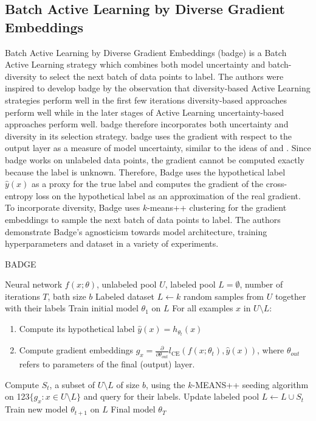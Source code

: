\subsection{Batch Active Learning by Diverse Gradient Embeddings}
\label{sec:Related_work:Active_Learning:BADGE}
Batch Active Learning by Diverse Gradient Embeddings (\gls{badge}) \cite{ash2019deep} is a Batch Active Learning strategy which combines both model uncertainty
and batch-diversity to select the next batch of data points to label. The authors were inspired to develop \gls{badge} by the observation that diversity-based
Active Learning strategies perform well in the first few iterations diversity-based approaches perform well while in the later stages of Active Learning
uncertainty-based approaches perform well. \gls{badge} therefore incorporates both uncertainty and diversity in its selection strategy. \gls{badge} uses the
gradient with respect to the output layer as a measure of model uncertainty, similar to the ideas of \cite{zhang2017active} and \cite{settles2007multiple}.
Since \gls{badge} works on unlabeled data points, the gradient cannot be computed exactly because the label is unknown. Therefore, Badge uses the hypothetical
label $\hat{y}(x)$ as a proxy for the true label and computes the gradient of the cross-entropy loss on the hypothetical label as an approximation of the
real gradient. To incorporate diversity, Badge uses $k$-means++ clustering \cite{arthur2007k} for the gradient embeddings to sample the next batch of data
points to label. The authors demonstrate Badge's agnosticism towards model architecture, training hyperparameters and dataset in a variety of experiments. 
\begin{algorithm}
    \caption{BADGE} \label{alg:Badge}
    \begin{algorithmic}[1]
        \Require Neural network $f(x;\theta)$, unlabeled pool $U$, labeled pool $L=\emptyset$, number of iterations $T$, bath size $b$
        \State Labeled dataset $L \leftarrow k$ random samples from $U$ together with their labels
        \State Train initial model $\theta_1$ on $L$
            \State For all examples $x$ in $U \setminus L$:
            \begin{enumerate}[leftmargin=0.8in]
                \item Compute its hypothetical label $\hat{y}(x) = h_{\theta_t}(x)$
                \item Compute gradient embeddings $g_x = \frac{\partial}{\partial \theta_{out}} l_{\text{CE}}(f(x;\theta_t),\hat{y}(x))$, where
                $\theta_{out}$ refers to parameters of the final (output) layer.
            \end{enumerate}
            \State Compute $S_t$, a subset of $U \setminus L$ of size $b$, using the $k$-MEANS++ seeding algorithm on {\color{white} 123}$\{ g_x: x \in U
            \setminus L\}$ and query for their labels.
            \State Update labeled pool $L \leftarrow L \cup S_t$
            \State Train new model $\theta_{t+1}$ on $L$
        \EndFor
        \return Final model $\theta_T$
    \end{algorithmic}
\end{algorithm}

